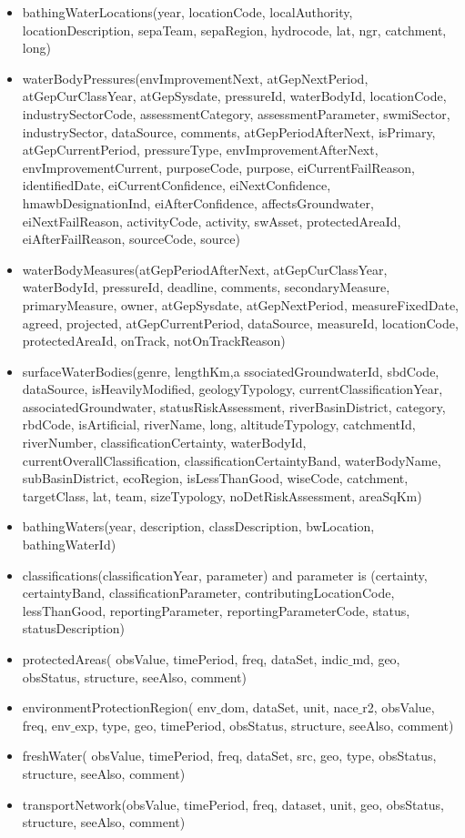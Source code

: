 \documentclass[a4paper,10pt]{article}
\begin{document}
\begin{itemize}
\item bathingWaterLocations(year, locationCode, localAuthority, locationDescription, sepaTeam, sepaRegion, hydrocode, lat, ngr, catchment, long)
\item waterBodyPressures(envImprovementNext, atGepNextPeriod, atGepCurClassYear, atGepSysdate, pressureId, waterBodyId, locationCode, industrySectorCode, assessmentCategory, assessmentParameter, swmiSector, industrySector, dataSource, comments, atGepPeriodAfterNext, isPrimary, atGepCurrentPeriod, pressureType, envImprovementAfterNext, envImprovementCurrent, purposeCode, purpose, eiCurrentFailReason, identifiedDate, eiCurrentConfidence, eiNextConfidence, hmawbDesignationInd, eiAfterConfidence, affectsGroundwater, eiNextFailReason, activityCode, activity, swAsset, protectedAreaId, eiAfterFailReason, sourceCode, source)
\item waterBodyMeasures(atGepPeriodAfterNext, atGepCurClassYear, waterBodyId, pressureId, deadline, comments, secondaryMeasure, primaryMeasure, owner, atGepSysdate, atGepNextPeriod, measureFixedDate, agreed, projected, atGepCurrentPeriod, dataSource, measureId, locationCode, protectedAreaId, onTrack, notOnTrackReason)
\item surfaceWaterBodies(genre, lengthKm,a ssociatedGroundwaterId, sbdCode, dataSource, isHeavilyModified, geologyTypology, currentClassificationYear, associatedGroundwater, statusRiskAssessment, riverBasinDistrict, category, rbdCode, isArtificial, riverName, long, altitudeTypology, catchmentId, riverNumber, classificationCertainty, waterBodyId, currentOverallClassification, classificationCertaintyBand, waterBodyName, subBasinDistrict, ecoRegion, isLessThanGood, wiseCode, catchment, targetClass, lat, team, sizeTypology, noDetRiskAssessment, areaSqKm)
\item bathingWaters(year, description, classDescription, bwLocation, bathingWaterId)
\item classifications(classificationYear, parameter)  and parameter is  (certainty, certaintyBand, classificationParameter, contributingLocationCode, lessThanGood, reportingParameter, reportingParameterCode, status, statusDescription) 
\item  protectedAreas( obsValue, timePeriod, freq, dataSet, indic$\_$md, geo, obsStatus, structure, seeAlso, comment) \\
\item  environmentProtectionRegion( env$\_$dom, dataSet, unit, nace$\_$r2,  obsValue, freq, env$\_$exp, type, geo, timePeriod, obsStatus, structure, seeAlso, comment)

\item freshWater(  obsValue, timePeriod, freq, dataSet, src, geo, type, obsStatus, structure, seeAlso, comment)
\item transportNetwork(obsValue, timePeriod, freq, dataset, unit, geo, obsStatus, structure, seeAlso, comment)
\end{itemize}
\end{document}
